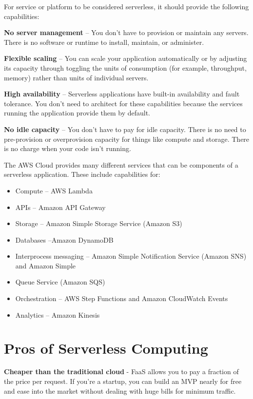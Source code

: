 For service or platform to be considered serverless, it should provide the following capabilities:

\textbf{No server management} – You don’t have to provision or maintain any servers. There is no software or
runtime to install, maintain, or administer.

\textbf{Flexible scaling} – You can scale your application automatically or by adjusting its capacity through toggling
the units of consumption (for example, throughput, memory) rather than units of individual servers.

\textbf{High availability} – Serverless applications have built-in availability and fault tolerance. You don't need to
architect for these capabilities because the services running the application provide them by default.

\textbf{No idle capacity} – You don't have to pay for idle capacity. There is no need to pre-provision or overprovision capacity for things like compute and storage. There is no charge when your code isn’t running.

The AWS Cloud provides many different services that can be components of a serverless application. These
include capabilities for:

\begin{itemize}
    \item Compute – AWS Lambda
    \item APIs – Amazon API Gateway
    \item Storage – Amazon Simple Storage Service (Amazon S3)
    \item Databases –Amazon DynamoDB
    \item Interprocess messaging – Amazon Simple Notification Service (Amazon SNS) and Amazon Simple
    \item Queue Service (Amazon SQS)
    \item Orchestration – AWS Step Functions and Amazon CloudWatch Events
    \item Analytics – Amazon Kinesis
\end{itemize}

\section{Pros of Serverless Computing}

\textbf{Cheaper than the traditional cloud} - FaaS allows you to pay a fraction of the price per request. If you’re a
startup, you can build an MVP nearly for free and ease into the market without dealing with huge bills for
minimum traffic.

